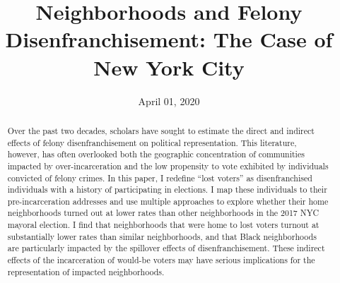 \documentclass[
  12pt,
]{article}
\title{Neighborhoods and Felony Disenfranchisement: The Case of New York City}
\author{}
\date{\vspace{-2.5em}April 01, 2020}
\begin{document}
\maketitle
\begin{abstract}
Over the past two decades, scholars have sought to estimate the direct and indirect effects of felony disenfranchisement on political representation. This literature, however, has often overlooked both the geographic concentration of communities impacted by over-incarceration and the low propensity to vote exhibited by individuals convicted of felony crimes. In this paper, I redefine ``lost voters'' as disenfranchised individuals with a history of participating in elections. I map these individuals to their pre-incarceration addresses and use multiple approaches to explore whether their home neighborhoods turned out at lower rates than other neighborhoods in the 2017 NYC mayoral election. I find that neighborhoods that were home to lost voters turnout at substantially lower rates than similar neighborhoods, and that Black neighborhoods are particularly impacted by the spillover effects of disenfranchisement. These indirect effects of the incarceration of would-be voters may have serious implications for the representation of impacted neighborhoods.
\end{abstract}

\newpage
{}
\end{document}
